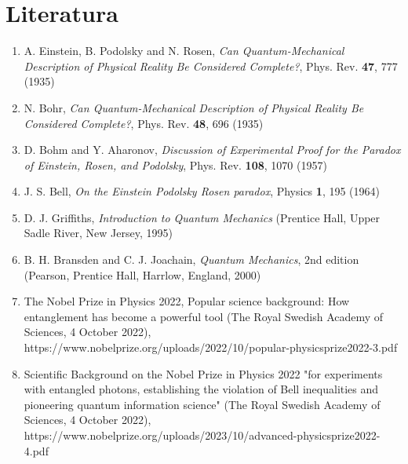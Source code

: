\chapter*{Literatura}


\begin{enumerate}

\item A. Einstein, B. Podolsky and N. Rosen, \textit{Can
Quantum-Mechanical Description of Physical Reality Be Considered
Complete?}, Phys. Rev. \textbf{47}, 777 (1935)

\item N. Bohr, \textit{Can Quantum-Mechanical Description of
Physical Reality Be Considered Complete?}, Phys. Rev. \textbf{48},
696 (1935)

\item D. Bohm and Y. Aharonov, \textit{Discussion of Experimental
Proof for the Paradox of Einstein, Rosen, and Podolsky}, Phys.
Rev. \textbf{108}, 1070 (1957)

\item J. S. Bell, \textit{On the Einstein Podolsky Rosen paradox},
Physics \textbf{1}, 195 (1964)

\item D. J. Griffiths, \textit{Introduction to Quantum Mechanics}
(Prentice Hall, Upper Sadle River, New Jersey, 1995)

\item B. H. Bransden and C. J. Joachain, \textit{Quantum
Mechanics}, 2nd edition (Pearson, Prentice Hall, Harrlow, England,
2000)

\item The Nobel Prize in Physics 2022, Popular science background:
How entanglement has become a powerful tool (The Royal Swedish
Academy of Sciences, 4 October 2022),
\textsf{https:/\!/www.nobelprize.org/uploads/2022/10/popular-physicsprize2022-3.pdf}

\item Scientific Background on the Nobel Prize in Physics 2022
"for experiments with entangled photons, establishing the
violation of Bell inequalities and pioneering quantum information
science" (The Royal Swedish Academy of Sciences, 4 October 2022),
\textsf{https:/\!/www.nobelprize.org/uploads/2023/10/advanced-physicsprize2022-4.pdf}

\end{enumerate}
